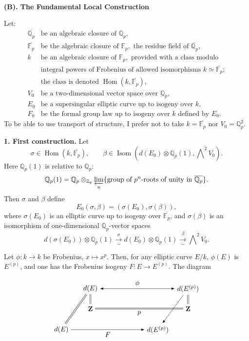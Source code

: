 \documentclass[11pt]{article}
\newcommand{\Fp}{\mathbb{F}_{p}}
\newcommand{\Qp}{\mathbb{Q}_{p}}
\newcommand{\Zp}{\mathbb{Z}_{p}}
\newcommand{\Hom}{\operatorname{Hom}}
\newcommand{\Isom}{\operatorname{Isom}}
\newcommand{\Prolim}{\varprojlim}
\begin{document}
\begin{center}
\textbf{(B). The Fundamental Local Construction}
\end{center}

Let:
\[
\begin{array}{ll}
\overline{\Qp} & \text{be an algebraic closure of }\Qp,\\
\overline{\Fp} & \text{be the algebraic closure of }\Fp,\text{ the residue field of }\overline{\Qp},\\
k & \text{be an algebraic closure of }\Fp,\text{ provided with a class modulo}\\
  & \text{integral powers of Frobenius of allowed isomorphisms }k\simeq\overline{\Fp};\\
  & \text{the class is denoted }\Hom(k,\overline{\Fp}),\\
V_0 & \text{be a two-dimensional vector space over }\Qp,\\
E_0 & \text{be a supersingular elliptic curve up to isogeny over }k,\\
F_0 & \text{be the formal group law up to isogeny over }k\text{ defined by }E_0 .
\end{array}
\]
To be able to use transport of structure, I prefer not to take \(k=\overline{\Fp}\) nor \(V_0=\Qp^2\).

\textbf{1. First construction.} Let
\[
\sigma\in\Hom(k,\overline{\Fp}),\qquad
\beta\in\Isom\!\left(d(E_0)\otimes\Qp(1),\bigwedge\nolimits^2V_0\right).
\]
Here \(\Qp(1)\) is relative to \(\Qp\):
\[
\Qp(1)=\Qp\otimes_{\Zp}\Prolim_n
\{\text{group of }p^n\text{-roots of unity in }\overline{\Qp}\}.
\]
Then \(\sigma\) and \(\beta\) define
\[
E_0(\sigma,\beta)=(\sigma(E_0),\sigma(\beta)),
\]
where \(\sigma(E_0)\) is an elliptic curve up to isogeny over \(\overline{\Fp}\), and \(\sigma(\beta)\) is an isomorphism of one-dimensional \(\Qp\)-vector spaces
\[
d(\sigma(E_0))\otimes\Qp(1)\xrightarrow[\sim]{\sigma}
d(E_0)\otimes\Qp(1)\xrightarrow[\sim]{\beta}\bigwedge\nolimits^2V_0 .
\]

Let \(\phi:k\to k\) be Frobenius, \(x\mapsto x^p\). Then, for any elliptic curve \(E/k\), \(\phi(E)\) is \(E^{(p)}\), and one has the Frobenius isogeny \(F:E\to E^{(p)}\). The diagram

\[
\begin{tikzpicture}[x=1.2cm,y=0.9cm,>=Latex,baseline=(current bounding box.center)]
  \node (tl) at (0,2.2) {$d(E)$};
  \node (tr) at (4.2,2.2) {$d(E^{(p)})$};
  \node (ml) at (0.0,1.05) {$\mathbf Z$};
  \node (mr) at (4.2,1.05) {$\mathbf Z$};
  \node (bl) at (-1.25,-0.15) {$d(E)$};
  \node (br) at (2.9,-0.15) {$d(E^{(p)})$};
  \draw[<->] (tl) -- node[above] {$\phi$} (tr);
  \draw[double distance=1.5pt] (tl) -- (ml);
  \draw[double distance=1.5pt] (tr) -- (mr);
  \draw[double distance=1.5pt] (ml) -- node[below] {$p$} (mr);
  \draw[double distance=1.5pt] (bl) -- (tl);
  \draw[->] (tr) -- (br);
  \draw[->] (bl) -- node[below] {$F$} (br);
\end{tikzpicture}
\]
\end{document}
